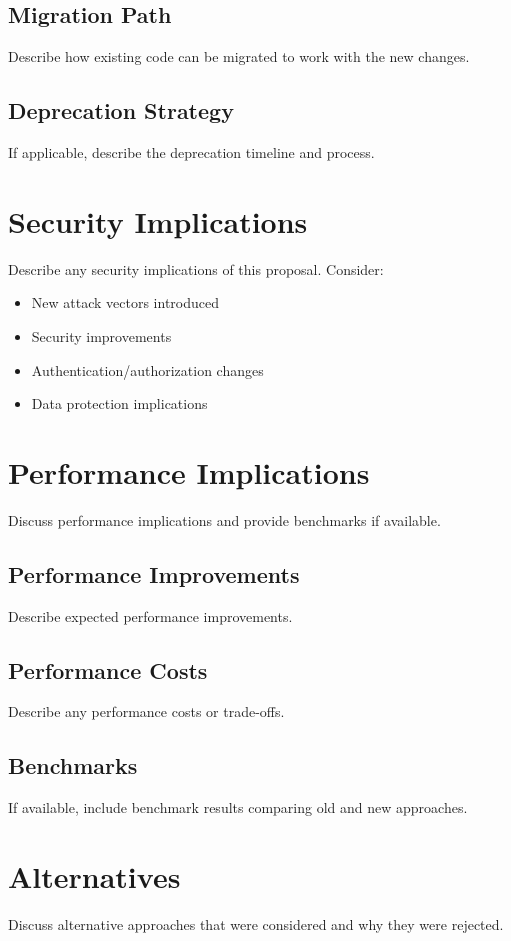 \documentclass[11pt]{article}
\begin{document}
	\subsection{Migration Path}
	Describe how existing code can be migrated to work with the new changes.
	
	\subsection{Deprecation Strategy}
	If applicable, describe the deprecation timeline and process.
	
	\section{Security Implications}
	Describe any security implications of this proposal. Consider:
	
	\begin{itemize}
		\item New attack vectors introduced
		\item Security improvements
		\item Authentication/authorization changes
		\item Data protection implications
	\end{itemize}
	
	\section{Performance Implications}
	Discuss performance implications and provide benchmarks if available.
	
	\subsection{Performance Improvements}
	Describe expected performance improvements.
	
	\subsection{Performance Costs}
	Describe any performance costs or trade-offs.
	
	\subsection{Benchmarks}
	If available, include benchmark results comparing old and new approaches.
	
	\section{Alternatives}
	Discuss alternative approaches that were considered and why they were rejected.
	
\end{document}
